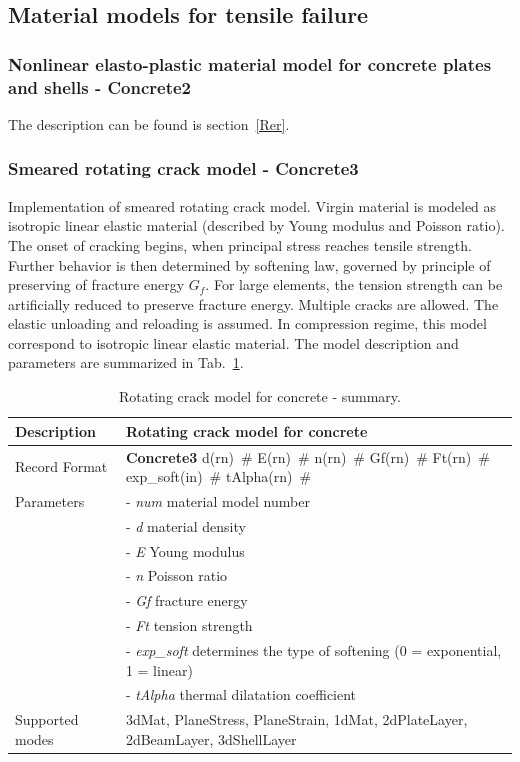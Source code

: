\documentclass[a4paper]{article}
\newcommand{\descitem}[1]{{\noindent \bf #1}}
\newcommand{\elemparam}[2]{{{#1\tiny (#2)}~\#}}
\newcommand{\param}[1]{{\it #1}}
\newenvironment{mmt}{\begin{tabular}{|l|p{9cm}|}}{\end{tabular}\\}
\newenvironment{mmt}{\begin{tabular}{|l|l|}}{\end{tabular}\\}
\begin{document}
\subsection{Material models for tensile failure}
\subsubsection{Nonlinear elasto-plastic material model for concrete
plates and shells - Concrete2}
The description can be found is section~\ref{Rer}.



\subsubsection{Smeared rotating crack model - Concrete3}
\label{rcm}
Implementation of smeared rotating crack model.
Virgin material is modeled as isotropic linear elastic material
(described by Young modulus and Poisson
ratio). The onset of cracking begins, when principal stress reaches
tensile strength.
Further behavior is then determined by softening law,
governed by principle of preserving of fracture
energy $G_f$. For large elements, the tension strength can be
artificially reduced
to preserve fracture energy. Multiple cracks are allowed.
The elastic unloading and reloading is assumed.
In compression regime, this model correspond to isotropic linear elastic material.
The model description and parameters are summarized
in Tab.~\ref{rcm_table}.

\begin{table}[!htb]
\begin{mmt}
\hline
Description & Rotating crack model for concrete\\
\hline
Record Format & \descitem{Concrete3} \elemparam{d}{rn} \elemparam{E}{rn}
\elemparam{n}{rn} \elemparam{Gf}{rn} \elemparam{Ft}{rn} \elemparam{exp\_soft}{in} \elemparam{tAlpha}{rn} \\
Parameters &- \param{num} material model number\\
&- \param{d} material density\\
&- \param{E} Young modulus\\
&- \param{n} Poisson ratio\\
&- \param{Gf} fracture energy\\
&- \param{Ft} tension strength\\
&- \param{exp\_soft} determines the type of softening (0 =
exponential, 1 = linear)\\
&- \param{tAlpha} thermal dilatation coefficient\\
Supported modes& 3dMat, PlaneStress, PlaneStrain, 1dMat,
2dPlateLayer, 2dBeamLayer, 3dShellLayer\\
\hline
\end{mmt}
\caption{Rotating crack model for concrete - summary.}
\label{rcm_table}
\end{table}
\end{document}
